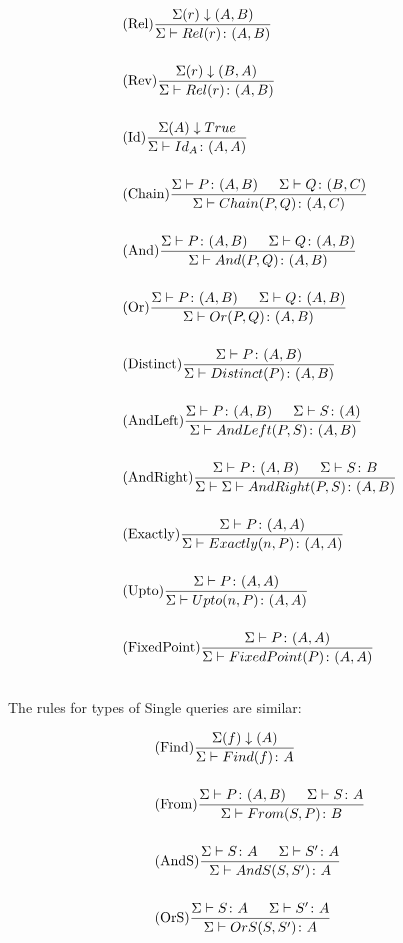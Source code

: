 \documentclass[12pt,a4paper,twoside,openright]{report}
\newcommand{\typeRule}[2]{\Sigma\vdash #1 \colon #2}
\begin{document}
\begin{align}
&\displaystyle\mbox{(Rel)}\frac{\Sigma(r)\downarrow(A, B)}{\typeRule{Rel(r)}{(A, B)}} \\[3ex]
&\displaystyle\mbox{(Rev)}\frac{\Sigma(r)\downarrow(B, A)}{\typeRule{Rel(r)}{(A, B)}} \\[3ex]
&\displaystyle\mbox{(Id)}\frac{\Sigma(A)\downarrow True}{\typeRule{Id_A}{(A, A)}} \\[3ex]
&\displaystyle\mbox{(Chain)}\frac{\typeRule{P}{(A, B)} \indent \typeRule{Q}{(B, C)}}{\typeRule{Chain(P, Q)}{(A, C)}} \\[3ex]
&\displaystyle\mbox{(And)}\frac{\typeRule{P}{(A, B)} \indent \typeRule{Q}{(A, B)}}{\typeRule{And(P, Q)}{(A, B)}} \\[3ex]
&\displaystyle\mbox{(Or)}\frac{\typeRule{P}{(A, B)} \indent \typeRule{Q}{(A, B)}}{\typeRule{Or(P, Q)}{(A, B)}} \\[3ex]
&\displaystyle\mbox{(Distinct)}\frac{\typeRule{P}{(A, B)}}{\typeRule{Distinct(P)}{(A, B)}} \\[3ex]
&\displaystyle\mbox{(AndLeft)}\frac{\typeRule{P}{(A, B)} \indent \typeRule{S}{(A)}}{\typeRule{AndLeft(P,S)}{(A, B)}} \\[3ex]
&\displaystyle\mbox{(AndRight)}\frac{\typeRule{P}{(A, B)} \indent \typeRule{S}{B}}{\Sigma \vdash \typeRule{AndRight(P, S)}{(A, B)}} \\[3ex]
&\displaystyle\mbox{(Exactly)}\frac{\typeRule{P}{(A, A)}}{\typeRule{Exactly(n, P)}{(A, A)}} \\[3ex]
&\displaystyle\mbox{(Upto)}\frac{\typeRule{P}{(A, A)}}{\typeRule{Upto(n, P)}{(A, A)}} \\[3ex]
&\displaystyle\mbox{(FixedPoint)}\frac{\typeRule{P}{(A, A)}}{\typeRule{FixedPoint(P)}{(A, A)}} \\[3ex]
\end{align}


The rules for types of Single queries are similar:

\begin{align}
&\displaystyle\mbox{(Find)}\frac{\Sigma(f)\downarrow(A)}{\typeRule{Find(f)}{A}} \\[3ex]
&\displaystyle\mbox{(From)}\frac{\typeRule{P}{(A, B)} \indent \typeRule{S}{A}}{\typeRule{From(S, P)}{B}} \\[3ex]
&\displaystyle\mbox{(AndS)}\frac{  \typeRule{S}{A} \indent  \typeRule{S'}{A}}{\typeRule{AndS(S, S')}{A}} \\[3ex]
&\displaystyle\mbox{(OrS)}\frac{  \typeRule{S}{A} \indent  \typeRule{S'}{A}}{\typeRule{OrS(S, S')}{A}} \\[3ex]
\end{align}
\end{document}

